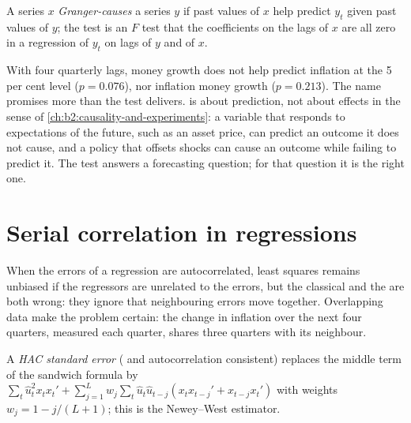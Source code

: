 \begin{definition}\label{def:b2:time-series:granger}
A series $x$ \emph{Granger-causes} a series $y$ if past values of $x$ help predict $y_t$ given
past values of $y$; the test is an $F$ test that the coefficients on the lags of $x$ are all zero in a regression of $y_t$
on lags of $y$ and of $x$.
\end{definition}

\label{lst:b2:time-series:granger}

\label{out:b2:time-series:granger}

With four quarterly lags, money growth does not help predict inflation at the 5 per cent level ($p = 0.076$), nor
inflation money growth ($p = 0.213$). The name promises more than the test delivers.  is about
prediction, not about effects in the sense of \cref{ch:b2:causality-and-experiments}: a variable that responds to
expectations of the future, such as an asset price, can predict an outcome it does not cause, and a policy that offsets
shocks can cause an outcome while failing to predict it. The test answers a forecasting question; for that question it is
the right one.

\section{Serial correlation in regressions}\label{sec:b2:time-series:hac}

When the errors of a regression are autocorrelated, least squares remains unbiased if the regressors are unrelated to the
errors, but the classical and the  are both wrong: they ignore that neighbouring
errors move together. Overlapping data make the problem certain: the change in inflation over the next four quarters,
measured each quarter, shares three quarters with its neighbour.

\begin{definition}\label{def:b2:time-series:hac}
A \emph{HAC standard error} ( and autocorrelation consistent) replaces the
middle term of the sandwich formula by $\sum_t\hat u_t^2x_tx_t' + \sum_{j=1}^Lw_j\sum_t\hat u_t\hat u_{t-j}(x_tx_{t-j}' +
x_{t-j}x_t')$ with weights $w_j = 1 - j/(L + 1)$; this is the Newey--West estimator.
\end{definition}

